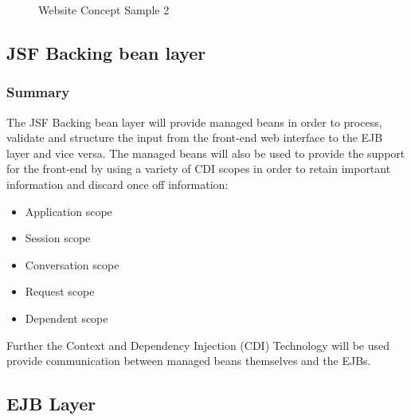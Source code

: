 \documentclass[12pt]{article}
\begin{document}
\begin{figure}[H]
\centering	
{}
\caption{Website Concept Sample 2}
\end{figure}

\newpage
\subsection{JSF Backing bean layer}
\subsubsection{Summary}
The JSF Backing bean layer will provide managed beans in order to process, validate and structure the input from the front-end web interface to the EJB layer and vice versa. The managed beans will also be used to provide the support for the front-end by using a variety of CDI scopes in order to retain important information and discard once off information:
\begin{itemize}
	\item Application scope
	\item Session scope
	\item Conversation scope
	\item Request scope
	\item Dependent scope
\end{itemize}
Further the Context and Dependency Injection (CDI) Technology will be used provide communication between managed beans themselves and the EJBs.

\newpage
\subsection{EJB Layer}
\end{document}

